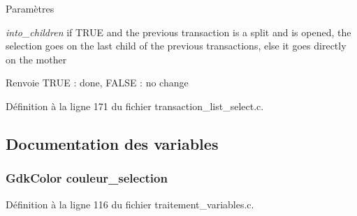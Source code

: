 \begin{DoxyParams}{Paramètres}
\item[{\em into\_\-children}]if TRUE and the previous transaction is a split and is opened, the selection goes on the last child of the previous transactions, else it goes directly on the mother\end{DoxyParams}
\begin{DoxyReturn}{Renvoie}
TRUE : done, FALSE : no change 
\end{DoxyReturn}


Définition à la ligne 171 du fichier transaction\_\-list\_\-select.c.



\subsection{Documentation des variables}
\subsubsection[{couleur\_\-selection}]{\setlength{\rightskip}{0pt plus 5cm}GdkColor {\bf couleur\_\-selection}}\label{transaction__list__select_8c_a35e437a6db69c9160eeb81674971108b}


Définition à la ligne 116 du fichier traitement\_\-variables.c.

